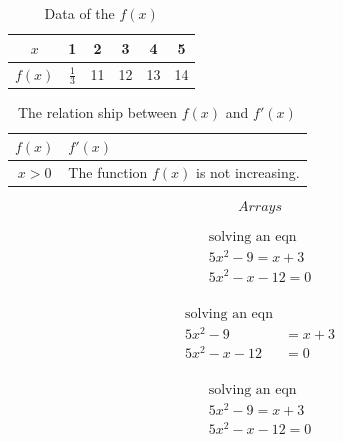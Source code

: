 \documentclass[12pt, a4paper]{article}
\begin{document}
\begin{table}[H]
\centering
\def\arraystretch{1.5}
\begin{tabular}{|c||c|c|c|c|c|}
\hline
$x$&1&2&3&4&5\\\hline
$f(x)$&$\frac{1}{3}$&11&12&13&14\\\hline

\end{tabular}
\caption{Data of the $f(x)$}
\end{table}

\begin{table}[H]
\caption{The relation ship between $f(x)$ and $f'(x)$ }
\centering
\def\arraystretch{1.5}
\begin{tabular}{|c|l|}
\hline
$f(x)$&$f'(x)$\\\hline
$x>0$ & The function $f(x)$ is not increasing.\\\hline

\end{tabular}

\end{table}

$$ Arrays $$

\begin{align}
\text{solving an eqn}\\
5x^2 -9 = x+3 \\
5x^2 - x- 12 = 0 \\
\end{align}

\begin{align*}
\text{solving an eqn}\\
5x^2 -9 &= x+3 \\
5x^2 - x- 12 &= 0 \\
\end{align*}

\begin{align}
\text{solving an eqn}\\
5x^2 -9 = x+3 \\
5x^2 - x- 12 = 0 \\
\end{align}
\end{document}
